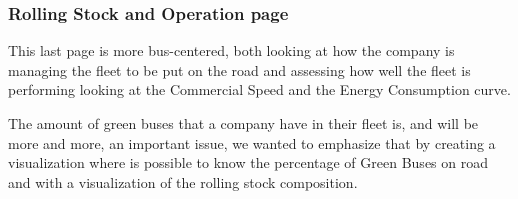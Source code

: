 \subsubsection{Rolling Stock and Operation page}
This last page is more bus-centered, both looking at how the company is managing the fleet to be put on the road and assessing how well the fleet is performing looking at the Commercial Speed and the Energy Consumption curve.

The amount of green buses that a company have in their fleet is, and will be more and more, an important issue, we wanted to emphasize that by creating a visualization where is possible to know the percentage of Green Buses on road and with a visualization of the rolling stock composition.






